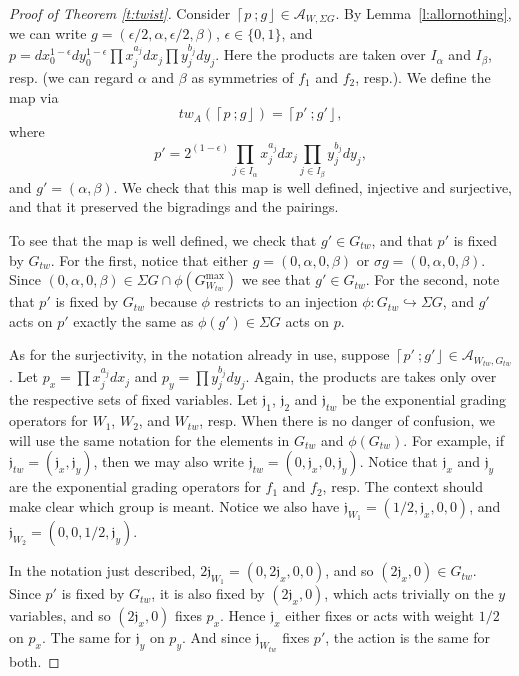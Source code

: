 \documentclass[10pt, letterpaper]{amsart}
\theoremstyle{remark}
\newcommand{\sA}{\mathscr{A}}
\newcommand{\fjrw}[2]{ \left\lceil #1 \:; #2 \right\rfloor }
\newcommand{\jw}{\mathfrak{j}}
\newcommand{\set}[1]{\{#1\}}
\newcommand{\tw}[1]{{#1}_{tw}}
\newcommand{\s}[1]{\Sigma #1}
\begin{document}
\begin{proof}[Proof of Theorem \ref{t:twist}] 
Consider $\fjrw{p}{g}\in \sA_{W,\s{G}}$. By Lemma~\ref{l:allornothing}, we can write $g=(\epsilon/2, \alpha, \epsilon/2, \beta)$, $\epsilon\in \set{0,1}$, and $p=dx_0^{1-\epsilon} dy_0^{1-\epsilon}\prod x_j^{a_j}dx_j \prod y_j^{b_j}dy_j$. Here the products are taken over $I_\alpha$ and $I_\beta$, resp. (we can regard $\alpha$ and $\beta$ as symmetries of $f_1$ and $f_2$, resp.). We define the map via
\[
tw_A(\fjrw{p}{g})=\fjrw{p'}{g'}, 
\]
where 
\[
p'=2^{(1-\epsilon)}\prod_{j\in I_\alpha} x_j^{a_j}dx_j \prod_{j\in I_\beta} y_j^{b_j}dy_j,
\] 
and $g'=(\alpha,\beta)$. We check that this map is well defined, injective and surjective, and that it preserved the bigradings and the pairings. 

To see that the map is well defined, we check that $g'\in \tw{G}$, and that $p'$ is fixed by $\tw{G}$. For the first, notice that either $g=(0,\alpha,0,\beta)$ or $\sigma g=(0,\alpha,0,\beta)$. Since $(0,\alpha,0,\beta)\in \s{G}\cap \phi (G^{\max}_{\tw{W}})$ we see that $g'\in \tw{G}$. For the second, note that $p'$ is fixed by $\tw{G}$ because $\phi$ restricts to an injection $\phi:\tw{G}\hookrightarrow \s{G}$, and $g'$ acts on $p'$ exactly the same as $\phi(g')\in \s{G}$ acts on $p$. 

As for the surjectivity, in the notation already in use, suppose $\fjrw{p'}{g'}\in \sA_{\tw{W},\tw{G}}$. Let $p_x=\prod x_j^{a_j}dx_j$ and $p_y=\prod y_j^{b_j}dy_j$. Again, the products are takes only over the respective sets of fixed variables. Let $\jw_{1}$, $\jw_{2}$ and $\tw{\jw}$ be the exponential grading operators for $W_1$, $W_2$, and $\tw{W}$, resp. When there is no danger of confusion, we will use the same notation for the elements in $\tw{G}$ and $\phi(\tw{G})$. For example, if $\tw{\jw}=(\jw_x,\jw_y)$, then we may also write $\tw{\jw}=(0,\jw_x,0,\jw_y)$. Notice that $\jw_x$ and $\jw_y$ are the exponential grading operators for $f_1$ and $f_2$, resp. The context should make clear which group is meant. Notice we also have $\jw_{W_1}=(1/2,\jw_x,0,0)$, and $\jw_{W_2}=(0,0,1/2,\jw_y)$.  

In the notation just described, $2\jw_{W_1}=(0,2\jw_x,0,0)$, and so $(2\jw_x,0)\in \tw{G}$. Since $p'$ is fixed by $\tw{G}$, it is also fixed by $(2\jw_x,0)$, which acts trivially on the $y$ variables, and so $(2\jw_x,0)$ fixes $p_x$. %
Hence $\jw_x$ either fixes or acts with weight $1/2$ on $p_x$. The same for $\jw_y$ on $p_y$. And since $\jw_{\tw{W}}$ fixes $p'$, the action is the same for both. 


\end{proof}
\end{document}
